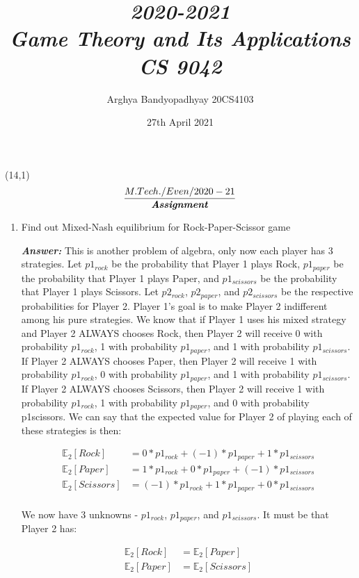 \documentclass[15pt]{article}
\title{\emph{2020-2021\\Game Theory and Its Applications\\CS 9042}}
\author{
Arghya Bandyopadhyay 20CS4103
}
\date{27th April 2021}
\begin{document}
\begin{textblock}{5}(14,1)
\noindent\Large \[\frac{M.Tech./Even/2020-21}{\textbf{\emph{Assignment}}}\]
\end{textblock}
\maketitle
\begin{enumerate}
\item
Find out Mixed-Nash equilibrium for Rock-Paper-Scissor game

\textbf{\emph{Answer: }}
This is another problem of algebra, only now each player has 3 strategies. Let $p1_{rock}$ be the probability that
Player 1 plays Rock, $p1_{paper}$ be the probability that Player 1 plays Paper, and $p1_{scissors}$ be the probability
that Player 1 plays Scissors. Let $p2_{rock}$, $p2_{paper}$, and $p2_{scissors}$ be the respective probabilities for Player 2.
Player 1's goal is to make Player 2 indifferent among his pure strategies. We know that if Player 1 uses his
mixed strategy and Player 2 ALWAYS chooses Rock, then Player 2 will receive 0 with probability $p1_{rock}$, 1
with probability $p1_{paper}$, and 1 with probability $p1_{scissors}$. If Player 2 ALWAYS chooses Paper, then Player
2 will receive 1 with probability $p1_{rock}$, 0 with probability $p1_{paper}$, and 1 with probability $p1_{scissors}$. If
Player 2 ALWAYS chooses Scissors, then Player 2 will receive 1 with probability $p1_{rock}$, 1 with probability
$p1_{paper}$, and 0 with probability p1scissors. We can say that the expected value for Player 2 of playing each
of these strategies is then:

\begin{equation} \label{eq1}
\begin{split}
\mathbb{E}_2[Rock] & = 0*p1_{rock}+(-1)*p1_{paper}+1*p1_{scissors}\\
\mathbb{E}_2[Paper] & = 1*p1_{rock}+0*p1_{paper}+(-1)*p1_{scissors}\\
\mathbb{E}_2[Scissors] & = (-1)*p1_{rock}+1*p1_{paper}+0*p1_{scissors}\\
\end{split}
\end{equation}

We now have 3 unknowns - $p1_{rock}$, $p1_{paper}$, and $p1_{scissors}$. It must be that Player 2 has:

\begin{equation} \label{eq2}
\begin{split}
\mathbb{E}_2[Rock] & =\mathbb{E}_2[Paper]\\
\mathbb{E}_2[Paper] & =\mathbb{E}_2[Scissors]\\
\end{split}
\end{equation}


\end{enumerate}
\end{document}
